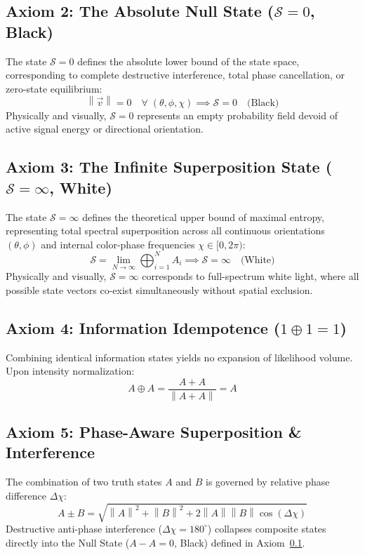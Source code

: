 \documentclass[12pt, a4paper]{article}
\providecommand{\norm}[1]{\left\lVert#1\right\rVert}
\begin{document}
\subsection{Axiom 2: The Absolute Null State ($\mathcal{S} = 0$, Black)}
\label{subsec:axiom_null}
The state $\mathcal{S} = 0$ defines the absolute lower bound of the state space, corresponding to complete destructive interference, total phase cancellation, or zero-state equilibrium:
\begin{equation}
    \norm{\vec{v}} = 0 \quad \forall \; (\theta, \phi, \chi) \implies \mathcal{S} = 0 \quad \text{(Black)}
    \label{eq:null_state}
\end{equation}
Physically and visually, $\mathcal{S} = 0$ represents an empty probability field devoid of active signal energy or directional orientation.

\subsection{Axiom 3: The Infinite Superposition State ($\mathcal{S} = \infty$, White)}
\label{subsec:axiom_infinite}
The state $\mathcal{S} = \infty$ defines the theoretical upper bound of maximal entropy, representing total spectral superposition across all continuous orientations $(\theta, \phi)$ and internal color-phase frequencies $\chi \in [0, 2\pi)$:
\begin{equation}
    \mathcal{S} = \lim_{N \to \infty} \bigoplus_{i=1}^{N} A_i \implies \mathcal{S} = \infty \quad \text{(White)}
    \label{eq:infinite_state}
\end{equation}
Physically and visually, $\mathcal{S} = \infty$ corresponds to full-spectrum white light, where all possible state vectors co-exist simultaneously without spatial exclusion.

\subsection{Axiom 4: Information Idempotence ($1 \oplus 1 = 1$)}
\label{subsec:axiom_idempotence}
Combining identical information states yields no expansion of likelihood volume. Upon intensity normalization:
\begin{equation}
    A \oplus A = \frac{A + A}{\norm{A + A}} = A
    \label{eq:idempotence_formal}
\end{equation}

\subsection{Axiom 5: Phase-Aware Superposition \& Interference}
\label{subsec:axiom_interference}
The combination of two truth states $A$ and $B$ is governed by relative phase difference $\Delta\chi$:
\begin{equation}
    A \pm B = \sqrt{\norm{A}^2 + \norm{B}^2 + 2\norm{A}\norm{B}\cos(\Delta\chi)}
    \label{eq:interference_formal}
\end{equation}
Destructive anti-phase interference ($\Delta\chi = 180^\circ$) collapses composite states directly into the Null State ($A - A = 0$, Black) defined in Axiom~\ref{subsec:axiom_null}.
\end{document}
